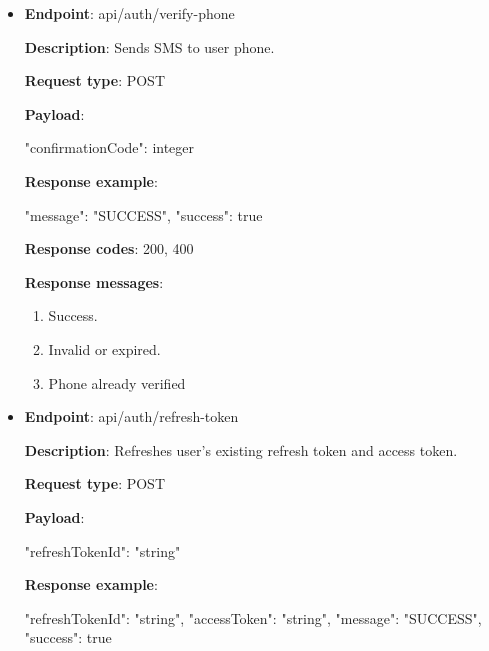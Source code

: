 \begin{itemize}
    \textbf{Response messages}:
    \begin{enumerate}
        \item Success.
        \item Invalid credentials.
    \end{enumerate}

    \item \textbf{Endpoint}: api/auth/verify-phone

    \textbf{Description}: Sends SMS to user phone.

    \textbf{Request type}: POST

    \textbf{Payload}:

    \begin{spverbatim}
    {
        "confirmationCode": integer
    }
    \end{spverbatim}

    \textbf{Response example}:

    \begin{spverbatim}
    {
        "message": "SUCCESS",
        "success": true
    }
    \end{spverbatim}

    \textbf{Response codes}: 200, 400

    \textbf{Response messages}:
    \begin{enumerate}
        \item Success.
        \item Invalid or expired.
        \item Phone already verified
    \end{enumerate}

    \item \textbf{Endpoint}: api/auth/refresh-token

    \textbf{Description}: Refreshes user's existing refresh token and access token.

    \textbf{Request type}: POST

    \textbf{Payload}:

    \begin{spverbatim}
    {
        "refreshTokenId": "string"
    }
    \end{spverbatim}

    \textbf{Response example}:

    \begin{spverbatim}
    {
        "refreshTokenId": "string",
        "accessToken": "string",
        "message": "SUCCESS",
        "success": true
    }
    \end{spverbatim}


\end{itemize}
